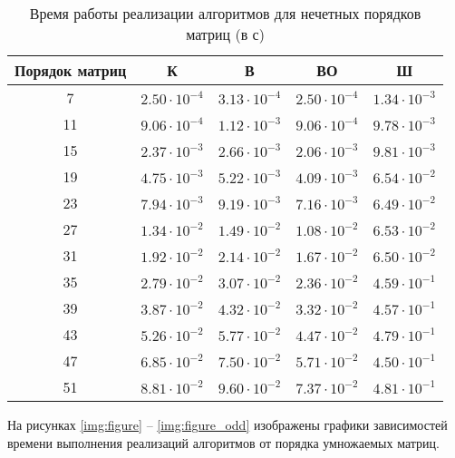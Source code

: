 \begin{table}[h]
	\begin{center}
		\begin{threeparttable}
			\captionsetup{justification=raggedright,singlelinecheck=off}
			\caption{Время работы реализации алгоритмов для нечетных порядков матриц (в с)}
			\label{tbl:time_measurements_odd}
			\begin{tabular}{|c|c|c|c|c|}
				\hline
				Порядок матриц & К & В & ВО & Ш \\
				\hline
				7 &$ 2.50\cdot 10^{-4} $&$ 3.13\cdot 10^{-4} $&$ 2.50\cdot 10^{-4} $&$ 1.34\cdot 10^{-3}$\\
				\hline
				11 &$ 9.06\cdot 10^{-4} $&$ 1.12\cdot 10^{-3} $&$ 9.06\cdot 10^{-4} $&$ 9.78\cdot 10^{-3}$\\
				\hline
				15 &$ 2.37\cdot 10^{-3} $&$ 2.66\cdot 10^{-3} $&$ 2.06\cdot 10^{-3} $&$ 9.81\cdot 10^{-3}$\\
				\hline
				19 &$ 4.75\cdot 10^{-3} $&$ 5.22\cdot 10^{-3} $&$ 4.09\cdot 10^{-3} $&$ 6.54\cdot 10^{-2}$\\
				\hline
				23 &$ 7.94\cdot 10^{-3} $&$ 9.19\cdot 10^{-3} $&$ 7.16\cdot 10^{-3} $&$ 6.49\cdot 10^{-2}$\\
				\hline
				27 &$ 1.34\cdot 10^{-2} $&$ 1.49\cdot 10^{-2} $&$ 1.08\cdot 10^{-2} $&$ 6.53\cdot 10^{-2}$\\
				\hline
				31 &$ 1.92\cdot 10^{-2} $&$ 2.14\cdot 10^{-2} $&$ 1.67\cdot 10^{-2} $&$ 6.50\cdot 10^{-2}$\\
				\hline
				35 &$ 2.79\cdot 10^{-2} $&$ 3.07\cdot 10^{-2} $&$ 2.36\cdot 10^{-2} $&$ 4.59\cdot 10^{-1}$\\
				\hline
				39 &$ 3.87\cdot 10^{-2} $&$ 4.32\cdot 10^{-2} $&$ 3.32\cdot 10^{-2} $&$ 4.57\cdot 10^{-1}$\\
				\hline
				43 &$ 5.26\cdot 10^{-2} $&$ 5.77\cdot 10^{-2} $&$ 4.47\cdot 10^{-2} $&$ 4.79\cdot 10^{-1}$\\
				\hline
				47 &$ 6.85\cdot 10^{-2} $&$ 7.50\cdot 10^{-2} $&$ 5.71\cdot 10^{-2} $&$ 4.50\cdot 10^{-1}$\\
				\hline
				51 &$ 8.81\cdot 10^{-2} $&$ 9.60\cdot 10^{-2} $&$ 7.37\cdot 10^{-2} $&$ 4.81\cdot 10^{-1}$\\
			\hline
			\end{tabular}
		\end{threeparttable}
	\end{center}
\end{table}

\clearpage
На рисунках \ref{img:figure} -- \ref{img:figure_odd} изображены графики зависимостей времени выполнения реализаций алгоритмов от порядка умножаемых матриц.

